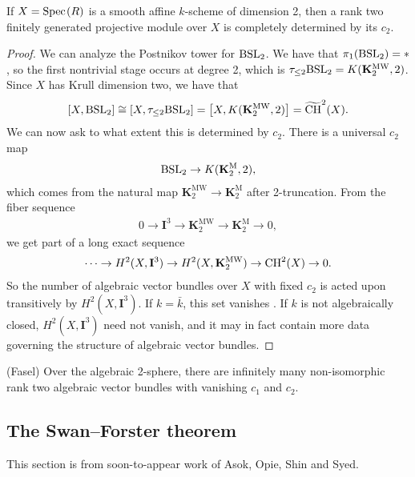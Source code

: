 \documentclass[11pt,openany]{book}
\providecommand{\KM}{\mathbf{K}^\mathrm{M}}
\providecommand{\KMW}{\mathbf{K}^\mathrm{MW}}
\providecommand{\CHW}{\widetilde{\mathrm{CH}}}
\begin{document}
\begin{theorem} If $X = \text{Spec}\hspace{0.1em}(R)$ is a smooth affine $k$-scheme of dimension 2, then a rank two finitely generated projective module over $X$ is completely determined by its $c_2$.
\end{theorem}
\begin{proof} We can analyze the Postnikov tower for $\mathrm{BSL}_2$. We have that $\pi_1(\mathrm{BSL}_2) = \ast$, so the first nontrivial stage occurs at degree 2, which is $\tau_{\le 2}\BSL_2 = K(\KMW_2,2)$. Since $X$ has Krull dimension two, we have that
\begin{align*}
    \left[ X,\BSL_2 \right] \cong \left[ X,\tau_{\le 2}\BSL_2 \right] = \left[ X, K(\KMW_2,2) \right] = \CHW^2(X).
\end{align*}
We can now ask to what extent this is determined by $c_2$. There is a universal $c_2$ map
\begin{align*}
    \BSL_2 \to K(\KM_2,2),
\end{align*}
which comes from the natural map $\KMW_2 \to \KM_2$ after 2-truncation. From the fiber sequence
\begin{align*}
    0 \to \mathbf{I}^3 \to \KMW_2 \to \KM_2 \to 0,
\end{align*}
we get part of a long exact sequence
\begin{align*}
    \cdots \to H^2(X,\mathbf{I}^3) \to H^2(X,\KMW_2) \to \CH^2(X) \to 0.
\end{align*}
So the number of algebraic vector bundles over $X$ with fixed $c_2$ is acted upon transitively by $H^2(X,\mathbf{I}^3)$. If $k = \bar{k}$, this set vanishes \cite[5.1]{AF3}. If $k$ is not algebraically closed, $H^2(X,\mathbf{I}^3)$ need not vanish, and it may in fact contain more data governing the structure of algebraic vector bundles. 
\end{proof}

\begin{example} (Fasel) Over the algebraic 2-sphere, there are infinitely many non-isomorphic rank two algebraic vector bundles with vanishing $c_1$ and $c_2$.
\end{example}

\subsection{The Swan--Forster theorem}

This section is from soon-to-appear work of Asok, Opie, Shin and Syed.
\end{document}
